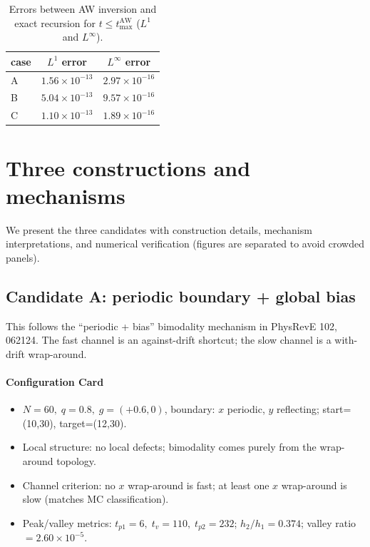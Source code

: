 \documentclass[11pt]{article}
\begin{document}
\begin{table}[!htbp]
  \centering
  \begin{tabular}{lcc}
    \toprule
    case & $L^1$ error & $L^\infty$ error \\
    \midrule
    A & $1.56\times 10^{-13}$ & $2.97\times 10^{-16}$ \\
    B & $5.04\times 10^{-13}$ & $9.57\times 10^{-16}$ \\
    C & $1.10\times 10^{-13}$ & $1.89\times 10^{-16}$ \\
    \bottomrule
  \end{tabular}
  \caption{Errors between AW inversion and exact recursion for $t\le t_{\max}^{\mathrm{AW}}$ ($L^1$ and $L^\infty$).}
  \label{tab:aw-errors}
\end{table}

\section{Three constructions and mechanisms}
We present the three candidates with construction details, mechanism interpretations, and numerical verification (figures are separated to avoid crowded panels).

\subsection{Candidate A: periodic boundary + global bias}
This follows the ``periodic + bias'' bimodality mechanism in PhysRevE 102, 062124. The fast channel is an against-drift shortcut; the slow channel is a with-drift wrap-around.

\paragraph{Configuration Card}
\begin{itemize}
  \item $N=60,\;q=0.8,\;g=(+0.6,0)$, boundary: $x$ periodic, $y$ reflecting; start=(10,30), target=(12,30).
  \item Local structure: no local defects; bimodality comes purely from the wrap-around topology.
  \item Channel criterion: no $x$ wrap-around is fast; at least one $x$ wrap-around is slow (matches MC classification).
  \item Peak/valley metrics: $t_{p1}=6,\;t_v=110,\;t_{p2}=232$; $h_2/h_1=0.374$; valley ratio$=2.60\times 10^{-5}$.
\end{itemize}
\end{document}
